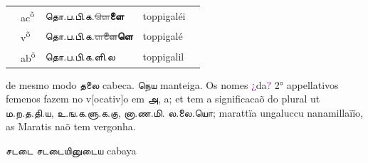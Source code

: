\documentclass[12pt,a4paper]{scrbook}
\begin{document}
\begin{tabular}{lllll}
            
    
            
                 &
                ac\textsuperscript{õ} &
                தொ.ப.பி.க.\sout{\textcolor{gray}{ளெ}}\textbf{ளை} &
                toppigaléi &
                 \\
    
            
    
            
                 &
                v\textsuperscript{õ} &
                தொ.ப.பி.க.\sout{\textcolor{gray}{ள}}\sout{\textcolor{gray}{\textbf{ளை}}}\textbf{ளெ} &
                toppigalé &
                 \\
    
            
    
            
                 &
                ab\textsuperscript{õ} &
                தொ.ப.பி.க.ளி.ல &
                toppigalil &
                 \\
    
            
    
        
\end{tabular}
    
        


            de mesmo modo தலை cabeca. நெய manteiga. Os nomes 
            \textcolor{purple}{¿}da\textcolor{purple}{?} 2° appellativos femenos fazem no v[ocativ]o em அ, a; et tem
            a significacaõ do plural ut ம.ற.த.தி.ய, உ.ங.க.ளு.க.கு, னா.ண.மி.
            ல.லை.யொ; marattïa ungaluccu nanamillaïïo, as Maratis naõ tem vergonha.
        
        


            சடடை சடடையினுடைய cabaya
        
    
   
\@openrighttrue\makeatother
    
\end{document}
